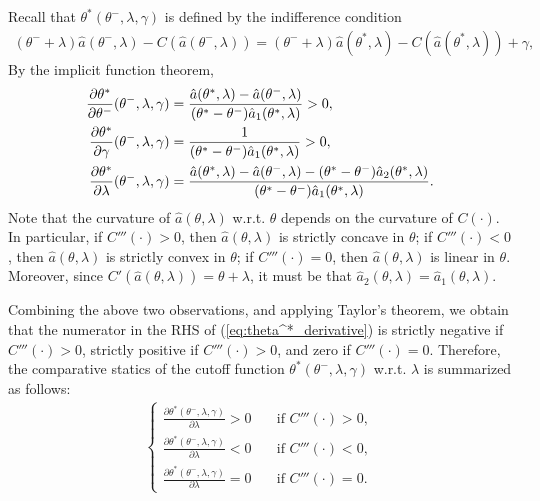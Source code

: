 \documentclass[english,12pt]{article}
\theoremstyle{plain}
\theoremstyle{plain}
\theoremstyle{definition}
\theoremstyle{definition}
\theoremstyle{assumption}
\theoremstyle{plain}
\theoremstyle{plain}
\theoremstyle{plain}
\theoremstyle{plain}
\theoremstyle{definition}%
\theoremstyle{plain}
\theoremstyle{plain}
\theoremstyle{plain}
\theoremstyle{plain}
\theoremstyle{plain}
\begin{document}
Recall that $\theta^*(\theta^-,\lambda,\gamma)$ is defined by the indifference condition 
\begin{align}
    (\theta^-+\lambda)\hat{a}(\theta^-,\lambda) - C(\hat{a}(\theta^-,\lambda)) = (\theta^-+\lambda)\hat{a}(\theta^*,\lambda) - C(\hat{a}(\theta^*,\lambda)) + \gamma,
\end{align}
By the implicit function theorem, 
\begin{align}\label{eq:theta^*_derivative}
    \frac{\partial \theta^*}{\partial \theta^-}(\theta^-,\lambda,\gamma) &= \frac{\hat{a}(\theta^*,\lambda)- \hat{a}(\theta^-,\lambda)}{(\theta^* - \theta^-)\hat{a}_1(\theta^*,\lambda)}>0,\notag\\
    \frac{\partial \theta^*}{\partial \gamma}(\theta^-,\lambda,\gamma) &= \frac{1}{(\theta^* - \theta^-)\hat{a}_1(\theta^*,\lambda)}>0,\notag\\
    \frac{\partial \theta^*}{\partial \lambda}(\theta^-,\lambda,\gamma) &= \frac{\hat{a}(\theta^*,\lambda)-\hat{a}(\theta^-,\lambda) -(\theta^*-\theta^-)\hat{a}_2(\theta^*,\lambda)}{(\theta^* - \theta^-)\hat{a}_1(\theta^*,\lambda)}.
\end{align}
Note that the curvature of $\hat{a}(\theta,\lambda)$ w.r.t. $\theta$ depends on the curvature of $C(\cdot)$. In particular, if $C'''(\cdot)>0$, then $\hat{a}(\theta,\lambda)$ is strictly concave in $\theta$; if $C'''(\cdot)<0$, then $\hat{a}(\theta,\lambda)$ is strictly convex in $\theta$; if $C'''(\cdot)=0$, then $\hat{a}(\theta,\lambda)$ is linear in $\theta$. Moreover, since $C'(\hat{a}(\theta,\lambda)) = \theta+\lambda$, it must be that $\hat{a}_2(\theta,\lambda) = \hat{a}_1(\theta,\lambda)$. 

Combining the above two observations, and applying Taylor's theorem, we obtain that the numerator in the RHS of (\ref{eq:theta^*_derivative}) is strictly negative if $C'''(\cdot)>0$, strictly positive if $C'''(\cdot)>0$, and zero if $C'''(\cdot)=0$. Therefore, the comparative statics of the cutoff function $\theta^*(\theta^-,\lambda,\gamma)$ w.r.t. $\lambda$ is summarized as follows:
\begin{align*} 
    \begin{cases}
        \frac{\partial \theta^*(\theta^-,\lambda,\gamma)}{\partial \lambda}>0\quad &\text{if }C'''(\cdot)>0,\\
        \frac{\partial \theta^*(\theta^-,\lambda,\gamma)}{\partial \lambda}<0\quad &\text{if }C'''(\cdot)<0,\\
        \frac{\partial \theta^*(\theta^-,\lambda,\gamma)}{\partial \lambda}=0\quad &\text{if }C'''(\cdot)=0.
    \end{cases}
\end{align*}
\end{document}
